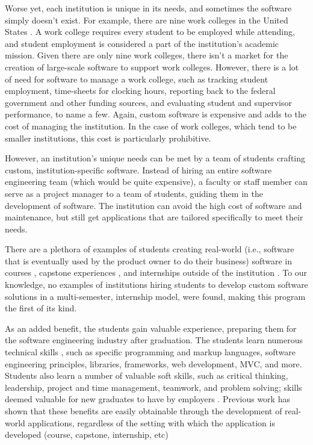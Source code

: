 Worse yet, each institution is unique in its needs, and sometimes the software simply doesn't exist. For example, there are nine work colleges in the United States \cite{WCCMembers, Ecclesia}. A work college requires every student to be employed while attending, and student employment is considered a part of the institution's academic mission. Given there are only nine work colleges, there isn't a market for the creation of large-scale software to support work colleges. However, there is a lot of need for software to manage a work college, such as tracking student employment, time-sheets for clocking hours, reporting back to the federal government and other funding sources, and evaluating student and supervisor performance, to name a few. Again, custom software is expensive and adds to the cost of managing the institution. In the case of work colleges, which tend to be smaller institutions, this cost is particularly prohibitive. 

However, an institution's unique needs can be met by a team of students crafting custom, institution-specific software. Instead of hiring an entire software engineering team (which would be quite expensive), a faculty or staff member can serve as a project manager to a team of students, guiding them in the development of software. The institution can avoid the high cost of software and maintenance, but still get applications that are tailored specifically to meet their needs.

There are a plethora of examples of students creating real-world (i.e., software that is eventually used by the product owner to do their business) software in courses \cite{coursevsproject, tadayon2004software}, capstone experiences \cite{keogh2007scalable, capstone}, and internships outside of the institution \cite{rochesterfirstundergradsoftwareteam}. To our knowledge, no examples of institutions hiring students to develop custom software solutions in a multi-semester, internship model, were found, making this program the first of its kind. 


As an added benefit, the students gain valuable experience, preparing them for the software engineering industry after graduation. The students learn numerous technical skills \cite{hardskills}, such as specific programming and markup languages, software engineering principles, libraries, frameworks, web development, MVC, and more. Students also learn a number of valuable soft skills, such as critical thinking, leadership, project and time management, teamwork, and problem solving; skills deemed valuable for new graduates to have by employers \cite{lavy2013soft}. Previous work has shown that these benefits are easily obtainable through the development of real-world applications, regardless of the setting with which the application is developed (course, capstone, internship, etc) \cite{heggen2018hiring, liu2005enriching, alzamil2005towards}

